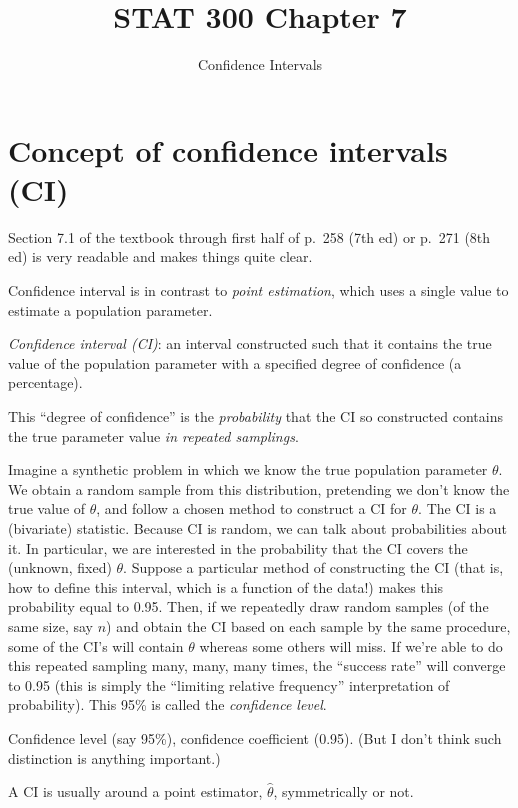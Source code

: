 \documentclass[12pt]{article}
\begin{document}
\title{STAT 300 Chapter 7}
\subtitle{Confidence Intervals}
\maketitle

\section{Concept of confidence intervals (CI)}

Section 7.1 of the textbook through first half of p.~258 (7th ed)
or p.~271 (8th ed)
is very readable and makes things quite clear.


Confidence interval is in contrast to \emph{point estimation},
which uses a single value to estimate a population parameter.

\emph{Confidence interval (CI)}: an interval constructed such that it
contains the true value of the population parameter with a specified
degree of confidence (a percentage).

This ``degree of confidence'' is the \emph{probability}
that the CI so constructed contains the true parameter value
\emph{in repeated samplings}.

Imagine a synthetic problem in which we know the true
population parameter $\theta$.
We obtain a random sample from this distribution,
pretending we don't know the true value of $\theta$,
and follow a chosen method to construct a CI for $\theta$.
The CI is a (bivariate) statistic.
Because CI is random, we can talk about probabilities about it.
In particular, we are interested in the probability that
the CI covers the (unknown, fixed) $\theta$.
Suppose a particular method of constructing the CI
(that is, how to define this interval, which is a function of the data!)
makes this probability equal to 0.95.
Then,
if we repeatedly draw random samples (of the same size, say $n$)
and obtain the CI based on each sample by the same procedure,
some of the CI's will contain $\theta$
whereas some others will miss.
If we're able to do this repeated sampling many,
many, many times, the ``success rate'' will converge to 0.95
(this is simply the ``limiting relative frequency'' interpretation of
probability).
This 95\% is called the \emph{confidence level}.

Confidence level (say 95\%), confidence coefficient (0.95).
(But I don't think such distinction is anything important.)

A CI is usually around a point estimator, $\hat{\theta}$,
symmetrically or not.
\end{document}
